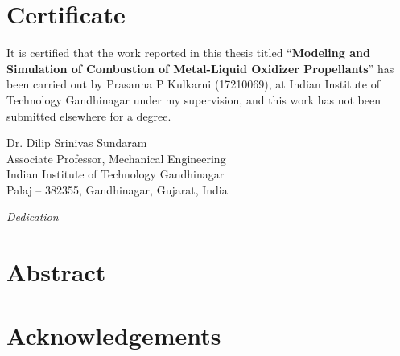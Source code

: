 \documentclass[12pt]{report}
\newcommand{\thTitle}{Modeling and Simulation of Combustion of Metal-Liquid Oxidizer Propellants}
\begin{document}
\chapter*{Certificate}
It is certified that the work reported in this thesis titled ``\textbf{\thTitle}'' has been carried out by Prasanna P Kulkarni (17210069), at Indian Institute of Technology Gandhinagar under my supervision, and this work has not been submitted elsewhere for a degree.

\begin{flushright}
    Dr. Dilip Srinivas Sundaram \\
    Associate Professor, Mechanical Engineering \\
    Indian Institute of Technology Gandhinagar \\
    Palaj – 382355, Gandhinagar, Gujarat, India
\end{flushright}

\newpage
\vfill
\begin{center}
    \large
    \vspace*{\fill}
    \textit{Dedication}
    \vspace*{\fill}
\end{center} 
\vfill

\chapter*{Abstract}


\chapter*{Acknowledgements}


\newpage
{}
\renewcommand{\cftchappresnum}{Chapter~}%
\renewcommand{\cftchapaftersnum}{:}%
\setlength{\cftchapnumwidth}{5em} %
\tableofcontents 
\end{document}

